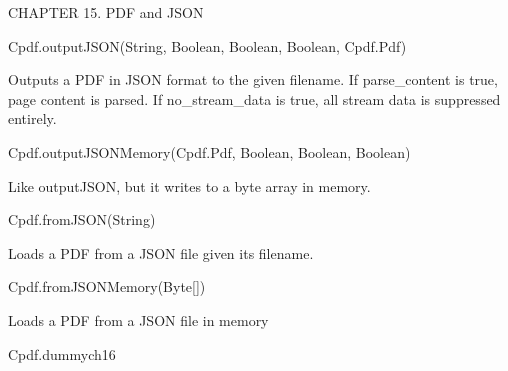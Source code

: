 CHAPTER 15. PDF and JSON

Cpdf.outputJSON(String, Boolean, Boolean, Boolean, Cpdf.Pdf)


Outputs a PDF
in JSON format to the given filename. If parse_content is true, page content
is parsed. If no_stream_data is true, all stream data is suppressed entirely.


Cpdf.outputJSONMemory(Cpdf.Pdf, Boolean, Boolean, Boolean)


Like
outputJSON, but it writes to a byte array in memory.


Cpdf.fromJSON(String)


Loads a PDF from a JSON file given its filename.


Cpdf.fromJSONMemory(Byte[])


Loads a PDF from a JSON file in memory


Cpdf.dummych16

